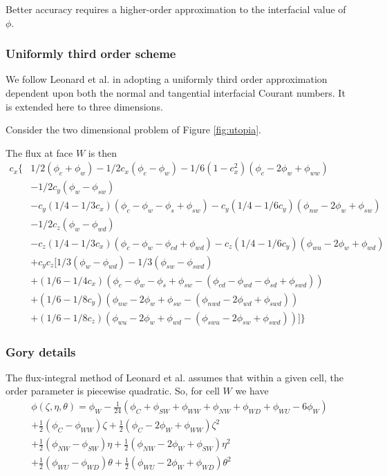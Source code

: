 Better accuracy requires
a higher-order approximation to the interfacial value of $\phi$.

\subsubsection{Uniformly third order scheme}

We follow Leonard et al. \cite{utopia} in adopting a uniformly third
order approximation dependent upon both the normal and tangential
interfacial Courant numbers. It is extended here to three dimensions.

Consider the two dimensional problem of Figure \ref{fig:utopia}.

The flux at face $W$ is then
\[\begin{array}{ll}
c_x \Big\{ &
1/2(\phi_c + \phi_w) - 1/2c_x (\phi_c - \phi_w)
 - 1/6 (1 -c_x^2)(\phi_c - 2\phi_w + \phi_{ww})\\
& - 1/2c_y (\phi_w - \phi_{sw})\\
& - c_y (1/4 - 1/3c_x)(\phi_c - \phi_w - \phi_s + \phi_{sw})
 - c_y (1/4 - 1/6c_y)(\phi_{nw} - 2\phi_w + \phi_{sw})\\
& - 1/2c_z (\phi_w - \phi_{wd}) \\
& - c_z (1/4 - 1/3c_x) (\phi_c - \phi_w -\phi_{cd} + \phi_{wd})
 - c_z (1/4 - 1/6 c_y) (\phi_{wu} - 2 \phi_w + \phi_{wd}) \\
& + c_y c_z \big[
1/3(\phi_w - \phi_{wd}) - 1/3 (\phi_{sw} - \phi_{swd}) \\
& + (1/6 - 1/4c_x) (\phi_c - \phi_w -\phi_s + \phi_{sw}
    -(\phi_{cd} - \phi_{wd} - \phi_{sd} + \phi_{swd}))\\
& + (1/6 - 1/8c_y)(\phi_{nw} - 2 \phi_w + \phi_{sw} 
                - (\phi_{nwd} - 2\phi_{wd} + \phi_{swd}))\\
& + (1/6 - 1/8c_z)(\phi_{wu} - 2\phi_w + \phi_{wd}
                 - (\phi_{swu} - 2\phi_{sw} + \phi_{swd}))\big] \Big\}
\end{array}\]

\subsubsection{Gory details}

The flux-integral method of Leonard et al. assumes that within a
given cell, the order parameter is piecewise quadratic. So, for
cell $W$ we have
\begin{eqnarray}
\phi (\zeta, \eta, \theta) = \phi_W - {\scriptstyle \frac{1}{24}} 
(\phi_C + \phi_{SW} + \phi_{WW} + \phi_{NW} + \phi_{WD} + \phi_{WU}
- 6\phi_W)\\
+ {\scriptstyle \frac{1}{2}} (\phi_C - \phi_{WW}) \zeta
+ {\scriptstyle \frac{1}{2}} (\phi_C - 2\phi_{W} + \phi_{WW}) \zeta^2\\
+ {\scriptstyle \frac{1}{2}} (\phi_{NW} - \phi_{SW}) \eta
+ {\scriptstyle \frac{1}{2}} (\phi_{NW} - 2\phi_{W} + \phi_{SW}) \eta^2\\
+ {\scriptstyle \frac{1}{2}} (\phi_{WU} - \phi_{WD}) \theta
+ {\scriptstyle \frac{1}{2}} (\phi_{WU} - 2\phi_{W} + \phi_{WD}) \theta^2
\end{eqnarray}


